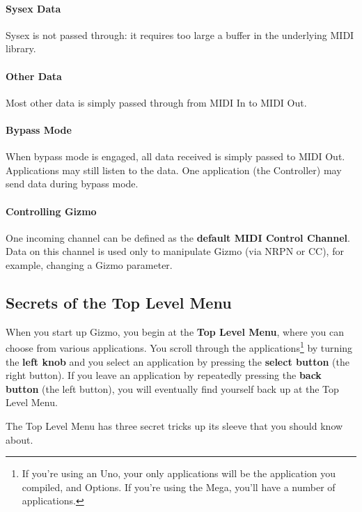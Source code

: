 \documentclass{article}
\begin{document}
\vspace{-0.5em}\paragraph{Sysex Data} Sysex is not passed through: it requires too large a buffer in the underlying MIDI library.

\vspace{-0.5em}\paragraph{Other Data} Most other data is simply passed through from MIDI In to MIDI Out.

\vspace{-0.5em}\paragraph{Bypass Mode} When bypass mode is engaged, all data received is simply passed to MIDI Out.  Applications may still listen to the data.  One application (the Controller) may send data during bypass mode.

\vspace{-0.5em}\paragraph{Controlling Gizmo} One incoming channel can be defined as the {\bf default MIDI Control Channel}.  Data on this channel is used only to manipulate Gizmo (via NRPN or CC), for example, changing a Gizmo parameter.


\subsection{Secrets of the Top Level Menu}
\label{secretsofthetoplevelmenu}

When you start up Gizmo, you begin at the {\bf Top Level Menu}, where you can choose from various applications. You scroll through the applications\footnote{If you're using an Uno, your only applications will be the application you compiled, and Options.  If you're using the Mega, you'll have a number of applications.} by turning the {\bf left knob} and you select an application by pressing the {\bf select button} (the right button).  If you leave an application by repeatedly pressing the {\bf back button} (the left button), you will eventually find yourself back up at the Top Level Menu.

The Top Level Menu has three secret tricks up its sleeve that you should know about.  
\end{document}
